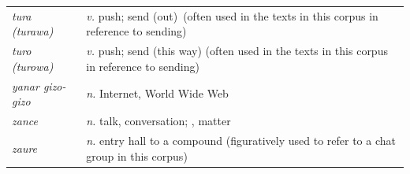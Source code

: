 \documentclass[output=paper
,newtxmath
,modfonts
,nonflat]{langsci/langscibook}
\begin{document}
\begin{tabularx}{\textwidth}{p{3cm}Q}
\textit{tura (turawa)} & \textit{v.} push; send (out)~(often used in the texts in this corpus in reference to sending)\\
\textit{turo (turowa)} & \textit{v.} push; send (this way) (often used in the texts in this corpus in reference to sending)\\
\textit{yanar gizo-gizo} & \textit{n.} Internet, World Wide Web \\
\textit{zance} & \textit{n.} talk, conversation; , matter \\
\textit{zaure} & \textit{n.} entry hall to a compound (figuratively used to refer to a chat group in this corpus)\\
\end{tabularx}


\sloppy
\printbibliography[heading=subbibliography,notkeyword=this]
\end{document}
